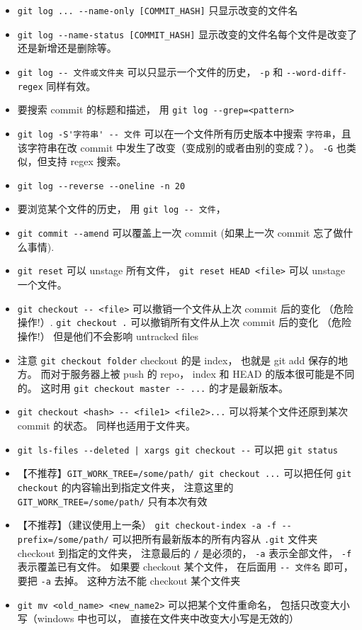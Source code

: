 \begin{itemize}
\item \verb|git log ... --name-only [COMMIT_HASH]| 只显示改变的文件名
\item \verb|git log --name-status [COMMIT_HASH]| 显示改变的文件名每个文件是改变了还是新增还是删除等。
\item \verb|git log -- 文件或文件夹| 可以只显示一个文件的历史， \verb|-p| 和 \verb|--word-diff-regex| 同样有效。
\item 要搜索 commit 的标题和描述， 用 \verb|git log --grep=<pattern>|
\item \verb|git log -S'字符串' -- 文件| 可以在一个文件所有历史版本中搜索 \verb|字符串|，且该字符串在改 commit 中发生了改变（变成别的或者由别的变成？）。 \verb|-G| 也类似，但支持 regex 搜索。
\item \verb|git log --reverse --oneline -n 20|
\item 要浏览某个文件的历史， 用 \verb|git log -- 文件|， 
\item \verb|git commit --amend| 可以覆盖上一次 commit (如果上一次 commit 忘了做什么事情).
\item \verb|git reset| 可以 unstage 所有文件， \verb|git reset HEAD <file>| 可以 unstage 一个文件。
\item \verb|git checkout -- <file>| 可以撤销一个文件从上次 commit 后的变化 （危险操作!）. \verb|git checkout .| 可以撤销所有文件从上次 commit 后的变化 （危险操作!） 但是他们不会影响 untracked files
\item 注意 \verb|git checkout folder| checkout 的是 index， 也就是 git add 保存的地方。 而对于服务器上被 push 的 repo， index 和 HEAD 的版本很可能是不同的。 这时用 \verb|git checkout master -- ...| 的才是最新版本。
\item \verb|git checkout <hash> -- <file1> <file2>...| 可以将某个文件还原到某次 commit 的状态。 同样也适用于文件夹。
\item \verb`git ls-files --deleted | xargs git checkout --` 可以把 \verb`git status`
\item 【不推荐】\verb|GIT_WORK_TREE=/some/path/ git checkout ...| 可以把任何 \verb|git checkout| 的内容输出到指定文件夹， 注意这里的 \verb|GIT_WORK_TREE=/some/path/| 只有本次有效
\item 【不推荐】（建议使用上一条） \verb|git checkout-index -a -f --prefix=/some/path/| 可以把所有最新版本的所有内容从 \verb|.git| 文件夹 checkout 到指定的文件夹， 注意最后的 \verb|/| 是必须的， \verb|-a| 表示全部文件， \verb|-f| 表示覆盖已有文件。 如果要 checkout 某个文件， 在后面用 \verb|-- 文件名| 即可， 要把 \verb|-a| 去掉。 这种方法不能 checkout 某个文件夹
\item \verb|git mv <old_name> <new_name2>| 可以把某个文件重命名， 包括只改变大小写（windows 中也可以， 直接在文件夹中改变大小写是无效的）

\end{itemize}
